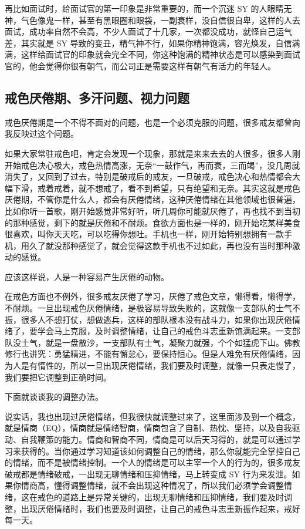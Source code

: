 \documentclass{ctexart}
\begin{document}
再比如面试时，给面试官的第一印象是非常重要的，而一个沉迷 SY 的人眼睛无神，气色像鬼一样，甚至有黑眼圈和眼袋，一副衰样，没自信很自卑，这样的人去面试，成功率自然不会高，不少人面试了十几家，一次都没成功，就怪自己运气差，其实就是 SY 导致的变丑，精气神不行，如果你精神饱满，容光焕发，自信满满，这样给面试官的印象就会完全不同，你这种饱满的精神状态是可以感染到面试官的，他会觉得你很有朝气，而公司正是需要这样有朝气有活力的年轻人。

\subsection{戒色厌倦期、多汗问题、视力问题}

戒色厌倦期是一个不得不面对的问题，也是一个必须克服的问题，很多戒友都曾向我反映过这个问题。

如果大家常驻戒色吧，肯定会发现一个现象，那就是来来去去的人很多，很多人刚开始戒色决心极大，戒色热情高涨，无奈“一鼓作气，再而衰，三而竭”，没几周就消失了，又回到了过去，特别是破戒后的戒友，一旦破戒，戒色决心和热情都会大幅下滑，戒着戒着，就不想戒了，看不到希望，只有绝望和无奈。其实这就是戒色厌倦期，不管你是什么人，都会有厌倦情绪，这种厌倦情绪在其他领域也很普遍，比如你听一首歌，刚开始感觉非常好听，听几周你可能就厌倦了，再也找不到当初的那种感觉，剩下的就是厌倦和不耐烦。食欲方面也是一样的，刚开始吃某样美食很喜欢，叫你天天吃，可以吃得你想吐。手机也一样，刚开始特别想拥有一款手机，用久了就没那种感觉了，就会觉得这款手机也不过如此，再也没有当时那种激动的感觉。

应该这样说，人是一种容易产生厌倦的动物。

在戒色方面也不例外，很多戒友厌倦了学习，厌倦了戒色文章，懒得看，懒得学，不耐烦。一旦出现戒色厌倦情绪，是极容易导致失败的，这就像一支部队的士气不振，很多人不想打仗，想做逃兵，这样的部队根本没有战斗力，如果你出现厌倦情绪了，要学会马上克服，及时调整情绪，让自己的戒色斗志重新饱满起来。一支部队没士气，就是一盘散沙，一支部队有士气，凝聚力就强，个个如猛虎下山。佛教修行也讲究：勇猛精进，不能有懈怠心，要保持恒心。但是人难免有厌倦情绪，因为人是有惰性的，所以一旦出现厌倦情绪，我们要及时调整，就像一只表走慢了，我们要把它调整到正确时间。

下面就谈谈我的调整办法。

说实话，我也出现过厌倦情绪，但我很快就调整过来了，这里面涉及到一个概念，就是情商（EQ），情商就是情绪智商，情商包含了自制、热忱、坚持，以及自我驱动、自我鞭策的能力。情商和智商不同，情商是可以后天习得的，就是可以通过学习来获得的。当你通过学习知道该如何调整自己的情绪，那么你就能完全掌控自己的情绪，而不是被情绪控制。一个人的情绪是可以主宰一个人的行为的，很多戒友破戒都是情绪破戒，一出现无聊情绪和压抑情绪，马上转变成 SY 行为来发泄。如果你情商高，懂得调整情绪，就不会出现这种情况了，所以我们必须学会调整情绪，这在戒色的道路上是异常关键的，出现无聊情绪和压抑情绪，我们要及时调整，出现厌倦情绪时，我们也要及时调整，让自己的戒色斗志重新振作起来，戒好每一天。
\end{document}
